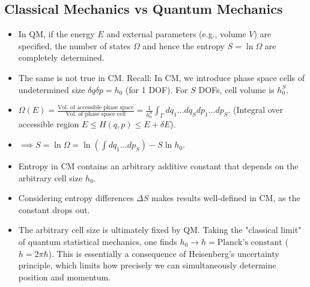 \documentclass[11pt]{article}
\newcommand{\deltaE}{\delta E}
\begin{document}
\subsection*{Classical Mechanics vs Quantum Mechanics}
\begin{itemize}
    \item In QM, if the energy $E$ and external parameters (e.g., volume $V$) are specified, the number of states $\Omega$ and hence the entropy $S=\ln\Omega$ are completely determined.
    \item The same is not true in CM. Recall: In CM, we introduce phase space cells of undetermined size $\delta q \delta p = h_0$ (for 1 DOF). For $S$ DOFs, cell volume is $h_0^S$.
    \item $\Omega(E) = \frac{\text{Vol. of accessible phase space}}{\text{Vol. of phase space cell}} = \frac{1}{h_0^S} \int_{\Gamma} dq_1 \dots dq_S dp_1 \dots dp_S$. (Integral over accessible region $E \le H(q,p) \le E+\deltaE$).
    \item $\implies S = \ln \Omega = \ln\left(\int dq_1 \dots dp_S\right) - S \ln h_0$.
    \item Entropy in CM contains an arbitrary additive constant that depends on the arbitrary cell size $h_0$.
    \item Considering entropy differences $\Delta S$ makes results well-defined in CM, as the constant drops out.
    \item The arbitrary cell size is ultimately fixed by QM. Taking the "classical limit" of quantum statistical mechanics, one finds $h_0 \to h = \text{Planck's constant}$ ($h=2\pi\hbar$). This is essentially a consequence of Heisenberg's uncertainty principle, which limits how precisely we can simultaneously determine position and momentum.
\end{itemize}
\end{document}
